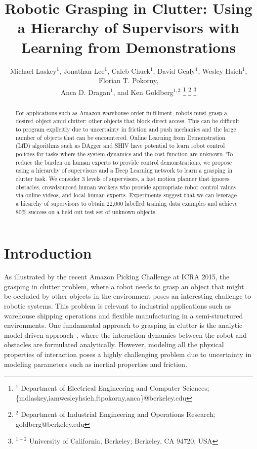\documentclass[10pt, conference]{ieeeconf}      %
\title{Robotic Grasping in Clutter: Using a Hierarchy of Supervisors with Learning from Demonstrations}
\author{Michael Laskey$^1$, Jonathan Lee$^1$, Caleb Chuck$^1$, David Gealy$^1$, Wesley Hsieh$^1$, Florian T. Pokorny,\\
 Anca D. Dragan$^1$, and Ken Goldberg$^{1,2}$%
\thanks{$^1$ Department of Electrical Engineering and Computer Sciences; {\small \{mdlaskey,iamwesleyhsieh,ftpokorny,anca\}@berkeley.edu} }%
\thanks{$^2$ Department of Industrial Engineering and Operations Research; {\small goldberg@berkeley.edu}}%
\thanks{$^{1-2}$ University of California, Berkeley;  Berkeley, CA 94720, USA}%
}
\begin{document}
\maketitle
\thispagestyle{empty}
\pagestyle{empty}



\begin{abstract}
For applications such as Amazon warehouse order fulfillment, robots must grasp a desired object amid clutter: other
objects that block direct access.  This can be difficult to program explicitly due to uncertainty in friction and push
mechanics and the large number of objects that can be encountered. Online Learning from Demonstration (LfD) algorithms
such as DAgger and SHIV have potential to learn robot control policies for tasks where the system dynamics and the cost
function are unknown. To reduce the burden on human experts to provide control demonstrations, we propose using a
hierarchy of supervisors and a Deep Learning network to learn a grasping in clutter task.  We consider 3 levels of
supervisors, a fast motion planner that ignores obstacles, crowdsourced human workers who
provide appropriate robot control values via online videos, and local human experts.  Experiments suggest that we can
leverage a hiearchy of supervisors to obtain 22,000 labelled training data examples and achieve 80\% success on a held out test set of unknown objects.

 \end{abstract}



\section{Introduction} 
As illustrated by the recent Amazon Picking Challenge at ICRA 2015, the grasping in clutter problem, where a robot needs
to grasp an object that might be occluded by other objects in the environment poses an interesting challenge to robotic
systems. This problem is relevant to industrial applications such as warehouse shipping operations and flexible manufacturing in a semi-structured environments. One fundamental approach to grasping in clutter is the analytic model driven approach~\cite{bicchi2000robotic},
where the interaction dynamics between the robot and obstacles are formulated analytically. However, modeling all the 
physical properties of interaction poses a highly challenging problem due to uncertainty in modeling parameters such as
inertial properties and friction. 
\end{document}
